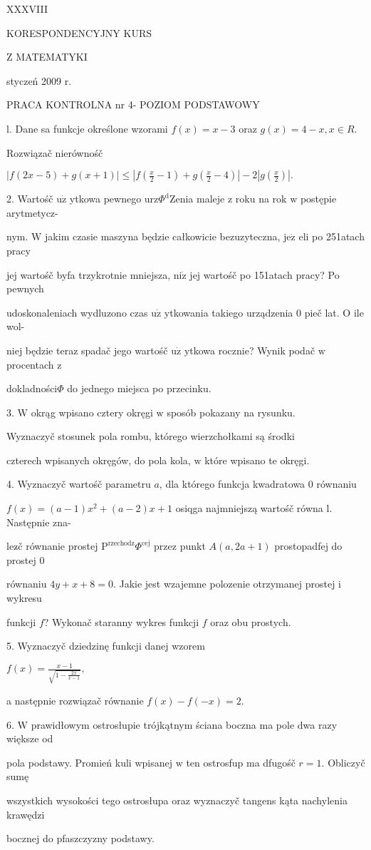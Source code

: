 \documentclass[a4paper,12pt]{article}
\begin{document}
XXXVIII

KORESPONDENCYJNY KURS

Z MATEMATYKI

styczeń 2009 r.

PRACA KONTROLNA nr 4- POZIOM PODSTAWOWY

l. Dane sa funkcje określone wzorami $f(x)=x-3$ oraz $g(x)=4-x, x\in R.$

Rozwiązač nierównośč

$|f(2x-5)+g(x+1)|\displaystyle \leq|f(\frac{x}{2}-1)+g(\frac{x}{2}-4)|-2|g(\frac{x}{2})|.$

2. Wartośč $\mathrm{u}\dot{\mathrm{z}}$ ytkowa pewnego $\mathrm{u}\mathrm{r}\mathrm{z}\Phi^{\mathrm{d}}$Zenia maleje $\mathrm{z}$ roku na rok $\mathrm{w}$ postępie arytmetycz-

nym. $\mathrm{W}$ jakim czasie maszyna będzie całkowicie bezuzyteczna, $\mathrm{j}\mathrm{e}\dot{\mathrm{z}}$ eli po 251atach pracy

jej wartośč byfa trzykrotnie mniejsza, $\mathrm{n}\mathrm{i}\dot{\mathrm{z}}$ jej wartośč po 151atach pracy? Po pewnych

udoskonaleniach wydluzono czas $\mathrm{u}\dot{\mathrm{z}}$ ytkowania takiego urządzenia $0$ pieč lat. $\mathrm{O}$ ile wol-

niej będzie teraz spadač jego wartośč $\mathrm{u}\dot{\mathrm{z}}$ ytkowa rocznie? Wynik podač $\mathrm{w}$ procentach $\mathrm{z}$

dokladności$\Phi$ do jednego miejsca po przecinku.

3. $\mathrm{W}$ okrąg wpisano cztery okręgi $\mathrm{w}$ sposób pokazany na rysunku.

Wyznaczyč stosunek pola rombu, którego wierzchołkami są środki

czterech wpisanych okręgów, do pola kola, $\mathrm{w}$ które wpisano te okręgi.

4. Wyznaczyč wartośč parametru $a$, dla którego funkcja kwadratowa $0$ równaniu

$f(x) = (a-1)x^{2}+(a-2)x+1$ osiqga najmniejszą wartośč równa l. Następnie zna-

lez$\acute{}$č równanie prostej $\mathrm{P}^{\mathrm{r}\mathrm{z}\mathrm{e}\mathrm{c}\mathrm{h}\mathrm{o}\mathrm{d}\mathrm{z}}\Phi^{\mathrm{c}\mathrm{e}\mathrm{j}}$ przez punkt $A(a,2a+1)$ prostopadfej do prostej $0$

równaniu $4y+x+8=0$. Jakie jest wzajemne polozenie otrzymanej prostej $\mathrm{i}$ wykresu

funkcji $f$? Wykonač staranny wykres funkcji $f$ oraz obu prostych.

5. Wyznaczyč dziedzinę funkcji danej wzorem

$f(x)=\displaystyle \frac{x-1}{\sqrt{1-\frac{2x}{x-1}}},$

a następnie rozwiązač równanie $f(x)-f(-x)=2.$

6. $\mathrm{W}$ prawidłowym ostrosłupie trójkątnym ściana boczna ma pole dwa razy większe od

pola podstawy. Promień kuli wpisanej $\mathrm{w}$ ten ostrosfup ma dfugośč $r=1$. Obliczyč sumę

wszystkich wysokości tego ostrosłupa oraz wyznaczyč tangens kąta nachylenia krawędzi

bocznej do pfaszczyzny podstawy.
\end{document}

